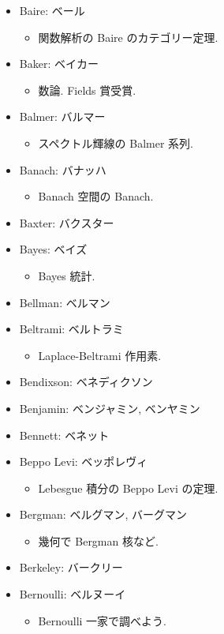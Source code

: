 \documentclass[openany, a4paper, oneside]{jsbook}
\begin{document}
\begin{itemize}
\item Baire: ベール
\begin{itemize}
\item 関数解析の Baire のカテゴリー定理.
\end{itemize}
\item Baker: ベイカー
\begin{itemize}
\item 数論. Fields 賞受賞.
\end{itemize}
\item Balmer: バルマー
\begin{itemize}
\item スペクトル輝線の Balmer 系列.
\end{itemize}
\item Banach: バナッハ
\begin{itemize}
\item Banach 空間の Banach.
\end{itemize}
\item Baxter: バクスター
\item Bayes: ベイズ
\begin{itemize}
\item Bayes 統計.
\end{itemize}
\item Bellman: ベルマン
\item Beltrami: ベルトラミ
\begin{itemize}
\item Laplace-Beltrami 作用素.
\end{itemize}
\item Bendixson: ベネディクソン
\item Benjamin: ベンジャミン, ベンヤミン
\item Bennett: ベネット
\item Beppo Levi: ベッポレヴィ
\begin{itemize}
\item Lebesgue 積分の Beppo Levi の定理.
\end{itemize}
\item Bergman: ベルグマン, バーグマン
\begin{itemize}
\item 幾何で Bergman 核など.
\end{itemize}
\item Berkeley: バークリー
\item Bernoulli: ベルヌーイ
\begin{itemize}
\item Bernoulli 一家で調べよう.
\end{itemize}

\end{itemize}
\end{document}
